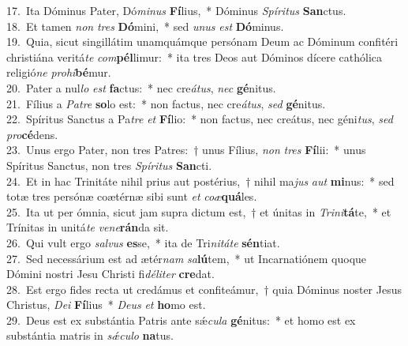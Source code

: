 {17.~}Ita Dóminus Pater, Dó\textit{mi}\textit{nus} \textbf{Fí}lius,~* Dóminus \textit{Spí}\textit{ri}\textit{tus} \textbf{San}ctus.\\
{18.~}Et tamen \textit{non} \textit{tres} \textbf{Dó}mini,~* sed \textit{u}\textit{nus} \textit{est} \textbf{Dó}minus.\\
{19.~}Quia, sicut singillátim unamquámque persónam Deum ac Dóminum confitéri christiána veritá\textit{te} \textit{com}\textbf{pél}limur:~* ita tres Deos aut Dóminos dícere cathólica religió\textit{ne} \textit{pro}\textit{hi}\textbf{bé}mur.\\
{20.~}Pater a nul\textit{lo} \textit{est} \textbf{fa}ctus:~* nec cre\textit{á}\textit{tus}, \textit{nec} \textbf{gé}nitus.\\
{21.~}Fílius a \textit{Pa}\textit{tre} \textbf{so}lo est:~* non factus, nec cre\textit{á}\textit{tus}, \textit{sed} \textbf{gé}nitus.\\
{22.~}Spíritus Sanctus a Pa\textit{tre} \textit{et} \textbf{Fí}lio:~* non factus, nec creátus, nec géni\textit{tus}, \textit{sed} \textit{pro}\textbf{cé}dens.\\
{23.~}Unus ergo Pater, non tres Patres:~† unus Fílius, \textit{non} \textit{tres} \textbf{Fí}lii:~* unus Spíritus Sanctus, non tres \textit{Spí}\textit{ri}\textit{tus} \textbf{San}cti.\\
{24.~}Et in hac Trinitáte nihil prius aut postérius,~† nihil ma\textit{jus} \textit{aut} \textbf{mi}nus:~* sed totæ tres persónæ coætérnæ sibi sunt \textit{et} \textit{co}\textit{æ}\textbf{quá}les.\\
{25.~}Ita ut per ómnia, sicut jam supra dictum est,~† et únitas in \textit{Tri}\textit{ni}\textbf{tá}te,~* et Trínitas in unitá\textit{te} \textit{ve}\textit{ne}\textbf{rán}da sit.\\
{26.~}Qui vult ergo \textit{sal}\textit{vus} \textbf{es}se,~* ita de Tri\textit{ni}\textit{tá}\textit{te} \textbf{sén}tiat.\\
{27.~}Sed necessárium est ad ætér\textit{nam} \textit{sa}\textbf{lú}tem,~* ut Incarnatiónem quoque Dómini nostri Jesu Christi fi\textit{dé}\textit{li}\textit{ter} \textbf{cre}dat.\\
{28.~}Est ergo fides recta ut credámus et confiteámur,~† quia Dóminus noster Jesus Christus, \textit{De}\textit{i} \textbf{Fí}lius~* \textit{De}\textit{us} \textit{et} \textbf{ho}mo est.\\
{29.~}Deus est ex substántia Patris ante sǽ\textit{cu}\textit{la} \textbf{gé}nitus:~* et homo est ex substántia matris in \textit{sǽ}\textit{cu}\textit{lo} \textbf{na}tus.\\
